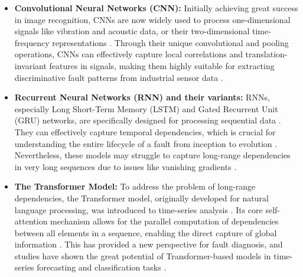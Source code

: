 \begin{itemize}
    \item \textbf{Convolutional Neural Networks (CNN):} Initially achieving great success in image recognition, CNNs are now widely used to process one-dimensional signals like vibration and acoustic data, or their two-dimensional time-frequency representations \cite{zhang2019deep, liu2018artificial}. Through their unique convolutional and pooling operations, CNNs can effectively capture local correlations and translation-invariant features in signals, making them highly suitable for extracting discriminative fault patterns from industrial sensor data \cite{zhao2019deep, lei2020applications}.
    \item \textbf{Recurrent Neural Networks (RNN) and their variants:} RNNs, especially Long Short-Term Memory (LSTM) and Gated Recurrent Unit (GRU) networks, are specifically designed for processing sequential data \cite{hochreiter1997long}. They can effectively capture temporal dependencies, which is crucial for understanding the entire lifecycle of a fault from inception to evolution \cite{filonov2016multivariateindustrialtimeseries, khan2018review}. Nevertheless, these models may struggle to capture long-range dependencies in very long sequences due to issues like vanishing gradients \cite{pascanu2013difficulty}.
    \item \textbf{The Transformer Model:} To address the problem of long-range dependencies, the Transformer model, originally developed for natural language processing, was introduced to time-series analysis \cite{vaswani2017attention}. Its core self-attention mechanism allows for the parallel computation of dependencies between all elements in a sequence, enabling the direct capture of global information \cite{vaswani2017attention}. This has provided a new perspective for fault diagnosis, and studies have shown the great potential of Transformer-based models in time-series forecasting and classification tasks \cite{zhou2021informer, wen2021time}.
\end{itemize}

